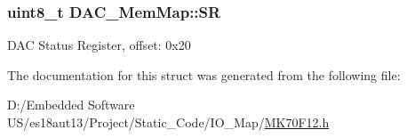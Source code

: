 \subsubsection[{S\+R}]{\setlength{\rightskip}{0pt plus 5cm}uint8\+\_\+t D\+A\+C\+\_\+\+Mem\+Map\+::\+S\+R}\label{struct_d_a_c___mem_map_a146115dd60e5e34ce6f1d8dc2b860877}
D\+A\+C Status Register, offset\+: 0x20 

The documentation for this struct was generated from the following file\+:\begin{DoxyCompactItemize}
\item 
D\+:/\+Embedded Software U\+S/es18aut13/\+Project/\+Static\+\_\+\+Code/\+I\+O\+\_\+\+Map/\hyperlink{_m_k70_f12_8h}{M\+K70\+F12.\+h}\end{DoxyCompactItemize}
